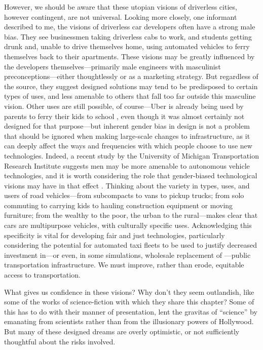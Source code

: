 However, we should be aware that these utopian visions of driverless
cities, however contingent, 
are not universal. Looking more closely, one informant described to me, the visions
of driverless car developers
often have a strong male bias. They see businessmen
taking driverless cabs to work, and students getting drunk and, unable
to drive themselves home, using automated vehicles to ferry themselves
back to their apartments. These visions may be greatly influenced by
the developers themselves---primarily male engineers with masculinist
preconceptions---either thoughtlessly or as a marketing strategy. But
regardless of the source, they suggest designed solutions may tend to
be predisposed to certain types of uses, and less amenable to others
that fall too far outside this masculine vision. Other uses are still
possible, of course---Uber is already being used by parents to ferry
their kids to school \cite{hoderParents} \cite{shapiroVan}, even
though it was almost certainly not designed 
for that
purpose---but inherent gender bias in design is not a problem that should be ignored
when making large-scale changes to infrastructure, as it can deeply
affect the ways and frequencies with which people choose to use new
technologies. Indeed, a recent study by the University of Michigan
Transportation Research Institute suggests men may be more
amenable to autonomous vehicle technologies, and it is worth
considering the role that gender-biased technological visions may have
in that
effect \cite{miglioreWomen}.
Thinking about the variety in types, uses, and users of road vehicles---from
subcompacts to vans to pickup trucks; from solo commuting to carrying kids to
hauling construction equipment or moving furniture; from the wealthy
to the poor, the urban to the rural---makes clear that cars are
multipurpose vehicles, with culturally specific uses.
Acknowledging this
specificity is vital for developing fair and just technologies,
particularly
considering the potential for automated taxi fleets to 
be used to justify decreased investment in---or even, in some
simulations, wholesale replacement of
\cite{frazzoliSingapore}---public transportation infrastructure. We must
improve, rather than erode, equitable access to transportation.


What gives us confidence in these visions? Why don't they seem
outlandish, like some of the works of science-fiction with which they
share this chapter? Some of this has to do with their manner of
presentation, lent the gravitas of ``science'' by emanating from
scientists rather than from the
illusionary powers of Hollywood. But many of these designed dreams are
overly optimistic, or not sufficiently thoughtful about the risks involved.

